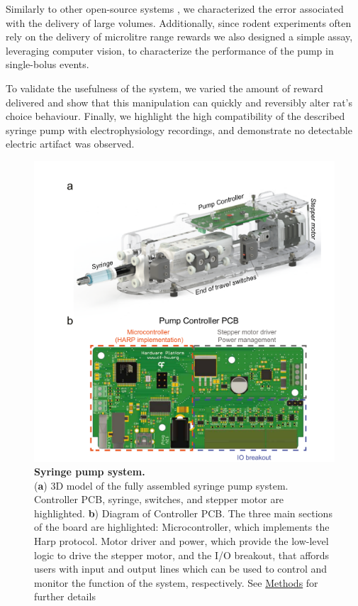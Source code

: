 Similarly to other open-source systems \citep{Wijnen2014, Amarante2019}, we characterized the error associated with the delivery of large volumes. Additionally, since rodent experiments often rely on the delivery of microlitre range rewards we also designed a simple assay, leveraging computer vision, to characterize the performance of the pump in single-bolus events.

To validate the usefulness of the system, we varied the amount of reward delivered and show that this manipulation can quickly and reversibly alter rat's choice behaviour. Finally, we highlight the high compatibility of the described syringe pump with electrophysiology recordings, and demonstrate no detectable electric artifact was observed.


\begin{figure}
	\centering
	\includegraphics[width=1.0\linewidth]{Figures/Artboard 1.pdf}
	\caption{\textbf{Syringe pump system.}\\
		(\textbf{a}) 3D model of the fully assembled syringe pump system. Controller PCB, syringe, switches, and stepper motor are highlighted.  \textbf{b}) Diagram of Controller PCB. The three main sections of the board are highlighted: Microcontroller, which implements the Harp protocol. Motor driver and power, which provide the low-level logic to drive the stepper motor, and the I/O breakout, that affords users with input and output lines which can be used to control and monitor the function of the system, respectively. See \hyperref[s:methods]{Methods} for further details}
	\label{fig:PumpDrawing}
\end{figure}
